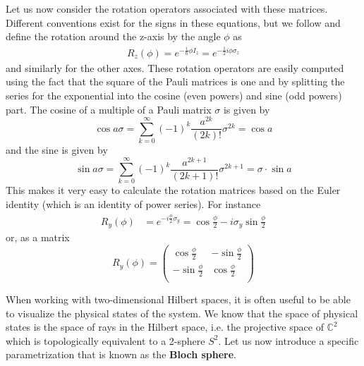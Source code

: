 \documentclass[a4paper, draft]{article}
\theoremstyle{own}
\theoremstyle{remark}
\newcommand{\C}{\mathbb{C}}
\begin{document}
Let us now consider the rotation operators associated with these matrices. Different conventions exist for the signs in these equations, but we follow \cite{Levitt} and define the rotation around the z-axis by the angle $\phi$ as 
\begin{align}
\label{eq:rotationzaxis}
R_z(\phi) = e^{-\frac{i}{\hbar}\phi I_z} = e^{-\frac{1}{2} i \phi \sigma_z}
\end{align}
and similarly for the other axes. These rotation operators are easily computed using the fact that the square of the Pauli matrices is one and by splitting the series for the exponential into the cosine (even powers) and sine (odd powers) part. The cosine of a multiple of a Pauli matrix $\sigma$ is given by
$$
\cos a \sigma = \sum_{k=0}^\infty (-1)^k \frac{a^{2k}}{(2k)!} \sigma^{2k} =  \cos a
$$
and the sine is given by
$$
\sin a \sigma = \sum_{k=0}^\infty (-1)^k \frac{a^{2k+1}}{(2k+1)!} \sigma^{2k+1} = \sigma \cdot \sin a
$$
This makes it very easy to calculate the rotation matrices based on the Euler identity (which is an identity of power series). For instance
\begin{align*}
R_y(\phi) &=  e^{-i \frac{\phi}{2}   \sigma_y} = 
 \cos \frac{\phi}{2} - i \sigma_y \sin \frac{\phi}{2}
\end{align*}
or, as a matrix
$$
R_y(\phi) = 
\begin{pmatrix}
\cos \frac{\phi}{2} & - \sin \frac{\phi}{2} \\
 - \sin \frac{\phi}{2} & \cos \frac{\phi}{2} \\
\end{pmatrix}
$$

When working with two-dimensional Hilbert spaces, it is often useful to be able to visualize the physical states of the system. We know that the space of physical states is the space of rays in the Hilbert space, i.e. the projective space of $\C^2$ which is topologically equivalent to a 2-sphere $S^2$. Let us now introduce a specific parametrization that is known as the {\bf Bloch sphere}.
\end{document}
